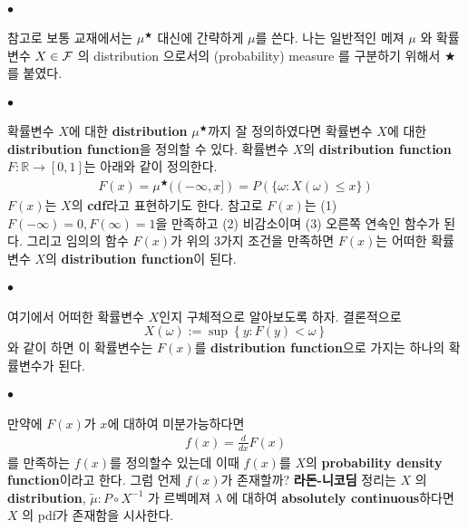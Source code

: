 \documentclass[12pt,oneside,english,a4paper]{article}
\def\ck{\paragraph{\Large$\bullet$}\Large}
\begin{document}
\ck 참고로 보통 교재에서는 $\mu^{\bigstar}$ 대신에 간략하게 $\mu$를 쓴다. 나는 일반적인 메져 $\mu$ 와 확률변수 $X \in {\cal F}$ 의 distribution 으로서의 (probability) measure 를 구분하기 위해서 $\bigstar$를 붙였다. 

\ck 확률변수 $X$에 대한 \textbf{distribution} $\mu^{\bigstar}$까지 잘 정의하였다면 확률변수 $X$에 대한 \textbf{distribution function}을 정의할 수 있다. 확률변수 $X$의 \textbf{distribution function} $F:\mathbb{R} \rightarrow [0,1]$는 아래와 같이 정의한다. 
\begin{align*}
F(x)=\mu^{\bigstar}((-\infty,x])=P(\{\omega: X(\omega) \leq x\})
\end{align*}
$F(x)$는 $X$의 \textbf{cdf}라고 표현하기도 한다. 참고로 $F(x)$는 (1) $F(-\infty)=0, F(\infty)=1$을 만족하고 (2) 비감소이며 (3) 오른쪽 연속인 함수가 된다. 그리고 임의의 함수 $F(x)$가 위의 3가지 조건을 만족하면 $F(x)$는 어떠한 확률변수 $X$의 \textbf{distribution function}이 된다.

\ck 여기에서 어떠한 확률변수 $X$인지 구체적으로 알아보도록 하자. 결론적으로 
\[
X(\omega):= \sup \left\{ y : F(y)<\omega \right\}
\]와 같이 하면 이 확률변수는 $F(x)$를 \textbf{distribution function}으로 가지는 하나의 확률변수가 된다. 

\ck 만약에 $F(x)$가 $x$에 대하여 미분가능하다면 
\begin{align*}
f(x)=\frac{d}{dx}F(x) 
\end{align*}
를 만족하는 $f(x)$를 정의할수 있는데 이때 $f(x)$를 $X$의 \textbf{probability density function}이라고 한다. 그럼 언제 $f(x)$가 존재할까? \textbf{라돈-니코딤} 정리는 $X$ 의 \textbf{distribution}, $\tilde \mu:P \circ X^{-1}$ 가 르벡메져 $\lambda$ 에 대하여 \textbf{absolutely continuous}하다면 $X$ 의 pdf가 존재함을 시사한다. 
\end{document}
